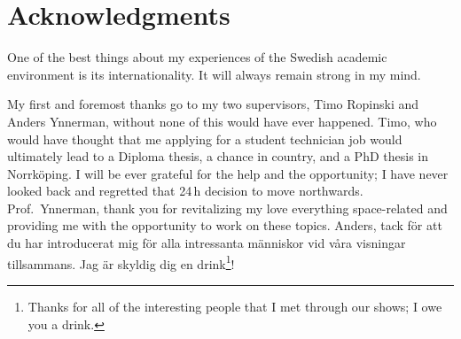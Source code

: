 \chapter*{Acknowledgments}
\novocalize

One of the best things about my experiences of the Swedish academic environment is its internationality. It will always remain strong in my mind.

My first and foremost thanks go to my two supervisors, Timo Ropinski and Anders Ynnerman, without none of this would have ever happened. Timo, who would have thought that me applying for a student technician job would ultimately lead to a Diploma thesis, a chance in country, and a PhD thesis in Norrk\"oping. I will be ever grateful for the help and the opportunity; I have never looked back and regretted that 24\,h decision to move northwards. Prof.~Ynnerman, thank you for revitalizing my love everything space-related and providing me with the opportunity to work on these topics. Anders, tack f\"or att du har introducerat mig f\"or alla intressanta m\"anniskor vid v\aa ra visningar tillsammans. Jag \"ar skyldig dig en drink\footnote{Thanks for all of the interesting people that I met through our shows; I owe you a drink.}!

